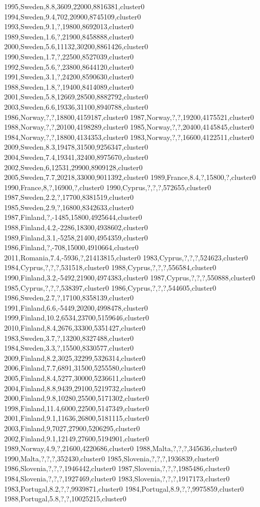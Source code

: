 1995,Sweden,8.8,3609,22000,8816381,cluster0
1994,Sweden,9.4,702,20900,8745109,cluster0
1993,Sweden,9.1,?,19800,8692013,cluster0
1989,Sweden,1.6,?,21900,8458888,cluster0
2000,Sweden,5.6,11132,30200,8861426,cluster0
1990,Sweden,1.7,?,22500,8527039,cluster0
1992,Sweden,5.6,?,23800,8644120,cluster0
1991,Sweden,3.1,?,24200,8590630,cluster0
1988,Sweden,1.8,?,19400,8414089,cluster0
2001,Sweden,5.8,12669,28500,8882792,cluster0
2003,Sweden,6.6,19336,31100,8940788,cluster0
1986,Norway,?,?,18800,4159187,cluster0
1987,Norway,?,?,19200,4175521,cluster0
1988,Norway,?,?,20100,4198289,cluster0
1985,Norway,?,?,20400,4145845,cluster0
1984,Norway,?,?,18800,4134353,cluster0
1983,Norway,?,?,16600,4122511,cluster0
2009,Sweden,8.3,19478,31500,9256347,cluster0
2004,Sweden,7.4,19341,32400,8975670,cluster0
2002,Sweden,6,12531,29900,8909128,cluster0
2005,Sweden,7.7,20218,33000,9011392,cluster0
1989,France,8.4,?,15800,?,cluster0
1990,France,8,?,16900,?,cluster0
1990,Cyprus,?,?,?,572655,cluster0
1987,Sweden,2.2,?,17700,8381519,cluster0
1985,Sweden,2.9,?,16800,8342633,cluster0
1987,Finland,?,-1485,15800,4925644,cluster0
1988,Finland,4.2,-2286,18300,4938602,cluster0
1989,Finland,3.1,-5258,21400,4954359,cluster0
1986,Finland,?,-708,15000,4910664,cluster0
2011,Romania,7.4,-5936,?,21413815,cluster0
1983,Cyprus,?,?,?,524623,cluster0
1984,Cyprus,?,?,?,531518,cluster0
1988,Cyprus,?,?,?,556584,cluster0
1990,Finland,3.2,-5492,21900,4974383,cluster0
1987,Cyprus,?,?,?,550888,cluster0
1985,Cyprus,?,?,?,538397,cluster0
1986,Cyprus,?,?,?,544605,cluster0
1986,Sweden,2.7,?,17100,8358139,cluster0
1991,Finland,6.6,-5449,20200,4998478,cluster0
1999,Finland,10.2,6534,23700,5159646,cluster0
2010,Finland,8.4,2676,33300,5351427,cluster0
1983,Sweden,3.7,?,13200,8327488,cluster0
1984,Sweden,3.3,?,15500,8330577,cluster0
2009,Finland,8.2,3025,32299,5326314,cluster0
2006,Finland,7.7,6891,31500,5255580,cluster0
2005,Finland,8.4,5277,30000,5236611,cluster0
2004,Finland,8.8,9439,29100,5219732,cluster0
2000,Finland,9.8,10280,25500,5171302,cluster0
1998,Finland,11.4,6000,22500,5147349,cluster0
2001,Finland,9.1,11636,26800,5181115,cluster0
2003,Finland,9,7027,27900,5206295,cluster0
2002,Finland,9.1,12149,27600,5194901,cluster0
1989,Norway,4.9,?,21600,4220686,cluster0
1988,Malta,?,?,?,345636,cluster0
1990,Malta,?,?,?,352430,cluster0
1985,Slovenia,?,?,?,1936839,cluster0
1986,Slovenia,?,?,?,1946442,cluster0
1987,Slovenia,?,?,?,1985486,cluster0
1984,Slovenia,?,?,?,1927469,cluster0
1983,Slovenia,?,?,?,1917173,cluster0
1983,Portugal,8.2,?,?,9939871,cluster0
1984,Portugal,8.9,?,?,9975859,cluster0
1988,Portugal,5.8,?,?,10025215,cluster0
